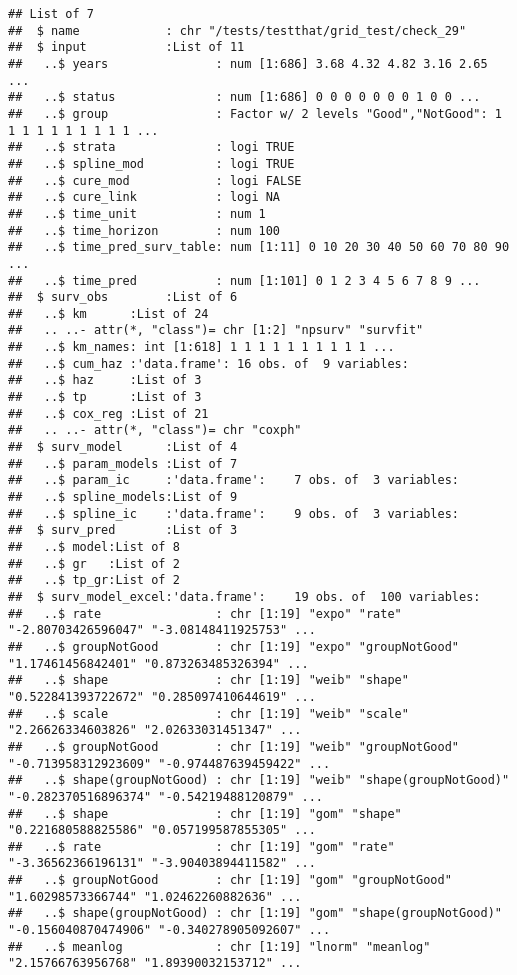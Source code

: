 \documentclass[
]{article}
\begin{document}
\begin{verbatim}
## List of 7
##  $ name            : chr "/tests/testthat/grid_test/check_29"
##  $ input           :List of 11
##   ..$ years               : num [1:686] 3.68 4.32 4.82 3.16 2.65 ...
##   ..$ status              : num [1:686] 0 0 0 0 0 0 0 1 0 0 ...
##   ..$ group               : Factor w/ 2 levels "Good","NotGood": 1 1 1 1 1 1 1 1 1 1 ...
##   ..$ strata              : logi TRUE
##   ..$ spline_mod          : logi TRUE
##   ..$ cure_mod            : logi FALSE
##   ..$ cure_link           : logi NA
##   ..$ time_unit           : num 1
##   ..$ time_horizon        : num 100
##   ..$ time_pred_surv_table: num [1:11] 0 10 20 30 40 50 60 70 80 90 ...
##   ..$ time_pred           : num [1:101] 0 1 2 3 4 5 6 7 8 9 ...
##  $ surv_obs        :List of 6
##   ..$ km      :List of 24
##   .. ..- attr(*, "class")= chr [1:2] "npsurv" "survfit"
##   ..$ km_names: int [1:618] 1 1 1 1 1 1 1 1 1 1 ...
##   ..$ cum_haz :'data.frame': 16 obs. of  9 variables:
##   ..$ haz     :List of 3
##   ..$ tp      :List of 3
##   ..$ cox_reg :List of 21
##   .. ..- attr(*, "class")= chr "coxph"
##  $ surv_model      :List of 4
##   ..$ param_models :List of 7
##   ..$ param_ic     :'data.frame':    7 obs. of  3 variables:
##   ..$ spline_models:List of 9
##   ..$ spline_ic    :'data.frame':    9 obs. of  3 variables:
##  $ surv_pred       :List of 3
##   ..$ model:List of 8
##   ..$ gr   :List of 2
##   ..$ tp_gr:List of 2
##  $ surv_model_excel:'data.frame':    19 obs. of  100 variables:
##   ..$ rate                : chr [1:19] "expo" "rate" "-2.80703426596047" "-3.08148411925753" ...
##   ..$ groupNotGood        : chr [1:19] "expo" "groupNotGood" "1.17461456842401" "0.873263485326394" ...
##   ..$ shape               : chr [1:19] "weib" "shape" "0.522841393722672" "0.285097410644619" ...
##   ..$ scale               : chr [1:19] "weib" "scale" "2.26626334603826" "2.02633031451347" ...
##   ..$ groupNotGood        : chr [1:19] "weib" "groupNotGood" "-0.713958312923609" "-0.974487639459422" ...
##   ..$ shape(groupNotGood) : chr [1:19] "weib" "shape(groupNotGood)" "-0.282370516896374" "-0.54219488120879" ...
##   ..$ shape               : chr [1:19] "gom" "shape" "0.221680588825586" "0.057199587855305" ...
##   ..$ rate                : chr [1:19] "gom" "rate" "-3.36562366196131" "-3.90403894411582" ...
##   ..$ groupNotGood        : chr [1:19] "gom" "groupNotGood" "1.60298573366744" "1.02462260882636" ...
##   ..$ shape(groupNotGood) : chr [1:19] "gom" "shape(groupNotGood)" "-0.156040870474906" "-0.340278905092607" ...
##   ..$ meanlog             : chr [1:19] "lnorm" "meanlog" "2.15766763956768" "1.89390032153712" ...

\end{verbatim}
\end{document}
